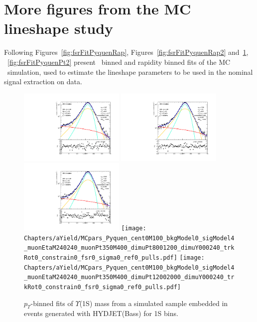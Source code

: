 \section{More figures from the MC lineshape study}
\label{sec:figs_mc}
Following Figures~\ref{fig:fsrFitPyquenRap}, Figures~\ref{fig:fsrFitPyquenRap2}
and~\ref{fig:fsrFitPyquenPt}, ~\ref{fig:fsrFitPyquenPt2} present \pt\ binned and rapidity binned
fits of the MC \PgUa\ simulation, used to estimate the lineshape
parameters to be used in the nominal signal extraction on data.
\begin{figure}
\begin{center}
\includegraphics[width=0.45\textwidth]{Chapters/aYield/MCpars_Pyquen_cent0M100_bkgModel0_sigModel4_muonEtaM240240_muonPt350M400_dimuPt000250_dimuY000240_trkRot0_constrain0_fsr0_sigma0_ref0_pulls.pdf}  
\includegraphics[width=0.45\textwidth]{Chapters/aYield/MCpars_Pyquen_cent0M100_bkgModel0_sigModel4_muonEtaM240240_muonPt350M400_dimuPt250500_dimuY000240_trkRot0_constrain0_fsr0_sigma0_ref0_pulls.pdf}
\includegraphics[width=0.45\textwidth]{Chapters/aYield/MCpars_Pyquen_cent0M100_bkgModel0_sigModel4_muonEtaM240240_muonPt350M400_dimuPt500800_dimuY000240_trkRot0_constrain0_fsr0_sigma0_ref0_pulls.pdf}
\texttt{[image: Chapters/aYield/MCpars\_Pyquen\_cent0M100\_bkgModel0\_sigModel4\_muonEtaM240240\_muonPt350M400\_dimuPt8001200\_dimuY000240\_trkRot0\_constrain0\_fsr0\_sigma0\_ref0\_pulls.pdf]} 
\texttt{[image: Chapters/aYield/MCpars\_Pyquen\_cent0M100\_bkgModel0\_sigModel4\_muonEtaM240240\_muonPt350M400\_dimuPt12002000\_dimuY000240\_trkRot0\_constrain0\_fsr0\_sigma0\_ref0\_pulls.pdf]}
\caption{$p_{T}$-binned fits of $\Upsilon$(1S) mass from a simulated
  sample embedded in events generated with
  HYDJET(Bass) for 1S bins.}
\label{fig:fsrFitPyquenPt}
\end{center}
\end{figure}

